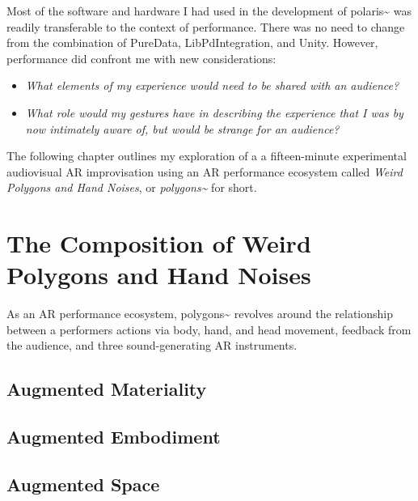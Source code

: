 Most of the software and hardware I had used in the development of polaris\textasciitilde{} was readily transferable to the context of performance. There was no need to change from the combination of PureData, LibPdIntegration, and Unity. However, performance did confront me with new considerations: 
\begin{itemize}
    \item \textit{What elements of my experience would need to be shared with an audience?} 
    \item \textit{What role would my gestures have in describing the experience that I was by now intimately aware of, but would be strange for an audience?} 
\end{itemize}
The following chapter outlines my exploration of a a fifteen-minute experimental audiovisual AR improvisation using an AR performance ecosystem called \textit{Weird Polygons and Hand Noises}, or \textit{polygons\textasciitilde{}} for short.



\section{The Composition of Weird Polygons and Hand Noises} \label{sec: polygons-composition}

As an AR performance ecosystem, polygons\textasciitilde{} revolves around the relationship between a performers actions via body, hand, and head movement, feedback from the audience, and three sound-generating AR instruments.

\subsection{Augmented Materiality} \label{sec: polygons-composition-material}


\subsection{Augmented Embodiment} \label{sec: polygons-composition-embodiment}



\subsection{Augmented Space} \label{sec: polygons-composition-space}




